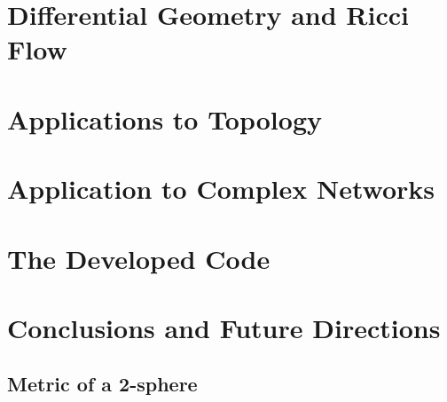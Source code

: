 \documentclass[a4paper,12pt,twoside,customfont,custombib,PageStyleI,draftclassic]{Settings/PhDThesisPSnPDF}
\begin{document}
\chapter{Differential Geometry and Ricci Flow}\label{chap:chapter2}





\chapter{Applications to Topology}\label{chap:chapter3}





\chapter{Application to Complex Networks}\label{chap:chapter4}




\chapter{The Developed Code}\label{chap:chapter5}





\chapter{Conclusions and Future Directions}\label{chap:chapter6}


\begin{appendices} %
\chapter{Metric of a 2-sphere}

\end{appendices}

\backmatter

\begin{spacing}{0.9}

\cleardoublepage
\nocite{*}
\printbibliography[heading=bibintoc, title={References}]

\end{spacing}

\end{document}
